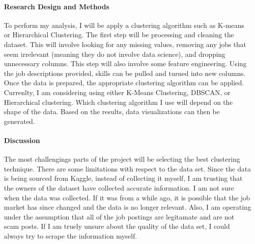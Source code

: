 \documentclass[12pt]{article}
\begin{document}
\paragraph{Research Design and Methods}

To perform my analysis, I will be apply a clustering algorithm such as K-means or Hierarchical Clustering. The first
step will be processing and cleaning the dataset. This will involve looking for any missing values, removing any jobs 
that seem irrelevant (meaning they do not involve data science), and dropping unnecessary columns. This step will also involve some 
feature engineering. Using the job descriptions provided, skills can be pulled and turned into new columns. Once the data is 
prepared, the appropriate clustering algorithm can be applied. Currenlty, I am considering using either K-Means Clustering, DBSCAN, or 
Hierarchical clustering. Which clustering algorithm I use will depend on the shape of the data. Based on the results, data 
visualizations can then be generated.

\paragraph{Discussion}


The most challengings parts of the project will be selecting the best clustering technique.
There are some limitations with respect to the data set. Since the data is being sourced from Kaggle, instead of collecting it 
myself, I am trusting that the owners of the dataset have collected accurate information. I am not sure when the data was collected.
If it was from a while ago, it is possible that the job market has since changed and the data is no longer relevant. Also, I am operating
under the assumption that all of the job postings are legitamate and are not scam posts. If I am truely unsure about the quality of the
data set, I could always try to scrape the information myself.




\end{document}
